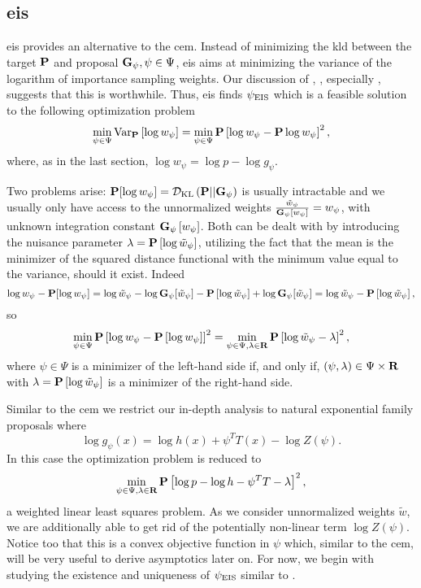 \subsection{\texorpdfstring{\Acrfull{eis}}{Efficient importance sampling}}
\label{subsec:eis}
\gls{eis} \citep{Richard2007Efficient} provides an alternative to the \gls{cem}. Instead of minimizing the \gls{kld} between the target $\P$ and proposal $\G_{\psi}, \psi \in \Psi$, \gls{eis} aims at minimizing the variance of the logarithm of importance sampling weights. 
Our discussion of \citep{Chatterjee2018Sample}, , especially , suggests that this is worthwhile. 
Thus, \acrshort{eis} finds $\peis$ which is a feasible solution to the following optimization problem
\begin{align}
    \label{eq:eis_optim}
\min_{\psi \in \Psi} \text{Var}_{\P} \left[ \log w_{\psi} \right] = \min_{\psi \in \Psi} \P \left[ \log w_{\psi} - \P \log w_{\psi} \right]^{2},
\end{align}
where, as in the last section, $\log w_{\psi} = \log p - \log g_{\psi}$.

Two problems arise: $\P [\log w_{\psi}] = \Dkl{\P}{\G_{\psi}}$ is usually intractable and we usually only have access to the unnormalized weights $\frac{\tilde w_{\psi}}{\G_{\psi} \left[ w_{\psi} \right]} = w_{\psi}$, with unknown integration constant $\G_{\psi} \left[ w_{\psi} \right]$. Both can be dealt with by introducing the nuisance parameter $\lambda = \P \left[ \log \tilde w_{\psi} \right]$, utilizing the fact that the mean is the minimizer of the squared distance functional with the minimum value equal to the variance, should it exist. Indeed 
$$
    \log w_{\psi} - \P [\log w_{\psi}] = \log \tilde w_{\psi} - \log \G_{\psi} [\tilde w_{\psi}] - \P \left[ \log \tilde w_{\psi} \right] + \log \G_{\psi}[\tilde w_{\psi}] = \log \tilde w_{\psi} - \P \left[ \log \tilde w_{\psi} \right],
$$
so
$$
    \min_{\psi \in \Psi} \P \left[ \log w_{\psi} - \P \left[ \log w_{\psi} \right] \right]^{2} = \min_{\psi \in \Psi, \lambda \in \R} \P \left[ \log \tilde w_{\psi} - \lambda \right]^{2},
$$
where $\psi\in \Psi$ is a minimizer of the left-hand side if, and only if, $(\psi, \lambda) \in \Psi \times \R$ with $\lambda = \P \left[ \log \tilde w_{\psi} \right]$ is a minimizer of the right-hand side. 

Similar to the \gls{cem} we restrict our in-depth analysis to natural exponential family proposals where $$\log g_{\psi}(x) = \log h(x) + \psi^{T}T(x) - \log Z(\psi).$$ In this case the optimization problem is reduced to
\begin{align}
    \label{eq:eis_exponential_families}
    \min_{\psi \in \Psi, \lambda \in \R} \P \left[ \log p - \log h - \psi^{T}T - \lambda \right]^{2},
\end{align}
a weighted linear least squares problem. As we consider unnormalized weights $\tilde w$, we are additionally able to get rid of the potentially non-linear term $\log Z(\psi)$.
Notice too that this is a convex objective function in $\psi$ which, similar to the \acrshort{cem}, will be very useful to derive asymptotics later on. For now, we begin with studying the existence and uniqueness of $\peis$ similar to .

